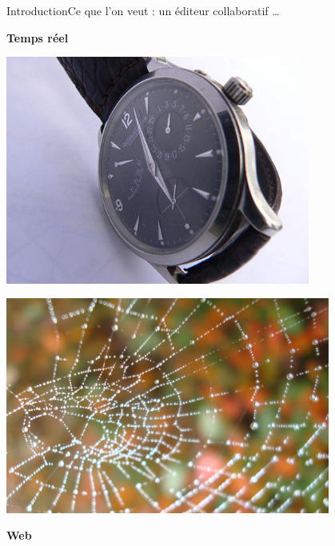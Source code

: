\begin{frame}{Introduction}{Ce que l'on veut : un éditeur collaboratif \ldots}
  
  \begin{minipage}{0.45\textwidth}
    \hfill \YES{\cmark} \textbf{Temps réel}
  \end{minipage}
  \begin{minipage}{0.45\textwidth}
    \includegraphics[width=0.75\textwidth]{img/watch.jpg}
  \end{minipage}
    
  \vspace{-0.75cm}

  \begin{minipage}{0.45\textwidth}
    \hfill  \includegraphics[width=0.8\textwidth]{img/toile.jpg}
  \end{minipage}  
  \begin{minipage}{0.45\textwidth}
    \textbf{Web} \YES{\cmark}
  \end{minipage}
  

\end{frame}
